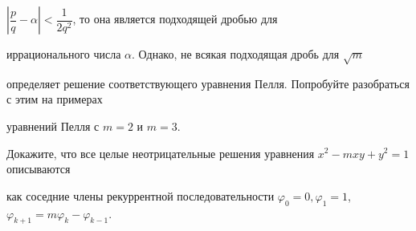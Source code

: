 \documentclass[a4paper,12pt]{article}
\begin{document}
$\left|\dfrac{p}{q}-\alpha\right|<\dfrac{1}{2q^2}$, то она является подходящей дробью для

иррационального числа $\alpha$. Однако, не всякая подходящая дробь для $\sqrt{m}$

определяет решение соответствующего уравнения Пелля. Попробуйте разобраться с этим на примерах

уравнений Пелля с $m=2$ и $m=3$.



 Докажите, что все целые неотрицательные решения  уравнения $x^2-mxy+y^2=1$ описываются

как соседние члены рекуррентной последовательности $\varphi_0=0,\varphi_1=1$, $\varphi_{k+1}=

m\varphi_k-\varphi_{k-1}$.






\GenXMLW














\end{document}
